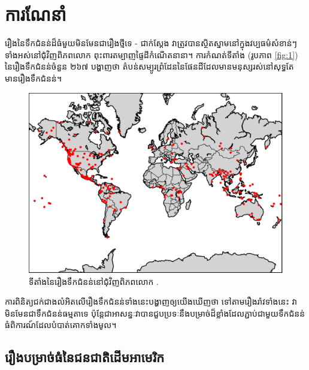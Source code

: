 \documentclass[10pt,twocolumn,letterpaper]{article}
\begin{document}
\section{ការណែនាំ}

រឿងនៃទឹកជំនន់ដ៏ធំមួយមិនមែនជារឿងថ្មីទេ - ជាក់ស្តែង វាត្រូវបានស្ថិតស្នាមនៅក្នុងវប្បធម៌សំខាន់ៗទាំងអស់នៅជុំវិញពិភពលោក ពុះពារតម្បាញផ្ទៃដីកំណើតនានា។ ការកំណត់ទីតាំង (រូបភាព \ref{fig:1}) នៃរឿងទឹកជំនន់ចំនួន ២៦៧ \cite{3} បង្ហាញថា តំបន់សម្បូរព្រំដែននៃផែនដីដែលមានមនុស្សរស់នៅសុទ្ធតែមានរឿងទឹកជំនន់។

\begin{figure}[h]
\begin{center}
   \includegraphics[width=1\linewidth]{b.png}
\end{center}
   \caption{ទីតាំងនៃរឿងទឹកជំនន់នៅជុំវិញពិភពលោក \cite{3}.}
\label{fig:1}
\label{fig:onecol}
\end{figure}

ការពិនិត្យជក់ជាងលំអិតលើរឿងទឹកជំនន់ទាំងនេះបង្ហាញឲ្យយើងឃើញថា ទៅតាមរឿងរ៉ាវទាំងនេះ វាមិនមែនជាទឹកជំនន់ធម្មតាទេ ប៉ុន្តែជាអាសន្នៈវាបានជួបប្រទៈនឹងបម្រាច់ដ៏ខ្លាំងដែលភ្ជាប់ជាមួយទឹកជំនន់ធំពិការណ៍ដែលបំបាត់គោកទាំងមូល។

\subsection{រឿងបម្រាច់ធំនៃជនជាតិដើមអាមេរិក}
\end{document}

